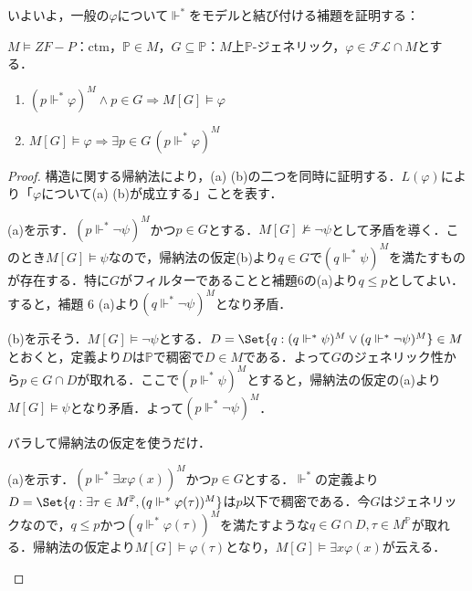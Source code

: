 \documentclass[a4j]{ltjsarticle}
\theoremstyle{definition}
\begin{document}
いよいよ，一般の$\varphi$について$\mathrel{\Vdash^*}$をモデルと結び付ける補題を証明する：

\begin{lemma}\label{lem:forces-and-genexts}
 $M \models ZF-P$：ctm，$\mathbb{P} \in M$，$G \subseteq \mathbb{P}$：$M$上$\mathbb{P}$-ジェネリック，$\varphi \in \mathcal{FL} \cap M$とする．
 \begin{enumerate}[label=(\alph*)]
  \item $(p \mathrel{\Vdash^*} \varphi)^M \wedge p \in G\Rightarrow M[G] \models \varphi$
  \item $M[G] \models \varphi \Rightarrow \exists p \in G\, (p \mathrel{\Vdash^*} \varphi)^M$
	\label{forces:truth-internal}
 \end{enumerate}
\end{lemma}
\begin{proof}
 構造に関する帰納法により，(a) (b)の二つを同時に証明する．$L(\varphi)$により「$\varphi$について(a) (b)が成立する」ことを表す．

\begin{description}[style=nextline,font=\underline]
 \item[$L(\psi) \rightarrow L(\neg \psi)$] 
  (a)を示す．$(p \mathrel{\Vdash^*} \neg \psi)^M$かつ$p \in G$とする．$M[G] \not\models \neg \psi$として矛盾を導く．このとき$M[G] \models \psi$なので，帰納法の仮定(b)より$q \in G$で$(q \mathrel{\Vdash^*} \psi)^M$を満たすものが存在する．特に$G$がフィルターであることと補題6の(a)より$q \leq p$としてよい．すると，補題 6 (a)より$(q \mathrel{\Vdash^*} \neg \psi)^M$となり矛盾．

 (b)を示そう．$M[G] \models \neg \psi$とする．$D = \Set{ q : (q \mathrel{\Vdash^*} \psi)^M \vee (q \mathrel{\Vdash^*} \neg \psi)^M} \in M$とおくと，定義より$D$は$\mathbb{P}$で稠密で$D \in M$である．よって$G$のジェネリック性から$p \in G \cap D$が取れる．ここで$(p \mathrel{\Vdash^*} \psi)^M$とすると，帰納法の仮定の(a)より$M[G] \models \psi$となり矛盾．よって$(p \mathrel{\Vdash^*} \neg \psi)^M$．

 \item[$L(\varphi), L(\psi) \rightarrow L(\varphi \wedge \psi)$] 
 バラして帰納法の仮定を使うだけ．

 \item[{$\forall \tau \in M^\mathbb{P} [L(\varphi(\tau))] \rightarrow L(\exists x \varphi(x))$}](a)を示す．$(p \mathrel{\Vdash^*} \exists x \varphi(x))^M$かつ$p \in G$とする．$\mathrel{\Vdash^*}$の定義より$D = \Set{q : \exists \tau \in M^\mathbb{P}, (q \mathrel{\Vdash^*} \varphi(\tau))^M}$は$p$以下で稠密である．今$G$はジェネリックなので，$q \leq p$かつ$(q \mathrel{\Vdash^*} \varphi(\tau))^M$を満たすような$q \in G \cap D, \tau \in M^\mathbb{P}$が取れる．帰納法の仮定より$M[G] \models \varphi(\tau)$となり，$M[G] \models \exists x \varphi(x)$が云える．


\end{description}
\end{proof}
\end{document}
